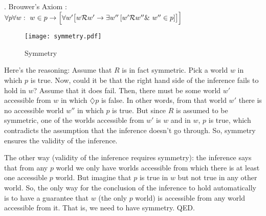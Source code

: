\ex. Brouwer's Axiom%
%
:\\
$\forall p \forall w:\ w\in p \rightarrow \Bigl[\forall w' \bigl[ w\mathcal{R}w'
\rightarrow \exists w'' \left[ w'\mathcal{R}w'' \&\ w''\in p\right]\bigr]\Bigr]$
%

\begin{figure}[htbp]
  \centering
    \texttt{[image: symmetry.pdf]}
  \caption{Symmetry}
  \label{fig:symmetry}
\end{figure}

\noindent
Here's %
%
the reasoning: Assume that $R$ is in fact symmetric. Pick a world $w$ in which
$p$ is true. Now, could it be that the right hand side of the inference fails to
hold in $w$? Assume that it does fail. Then, there must be some world $w'$
accessible from $w$ in which $\diamondsuit p$ is false. In other words, from
that world $w'$ there is no accessible world $w''$ in which $p$ is true. But
since $R$ is assumed to be symmetric, one of the worlds accessible from $w'$ is
$w$ and in $w$, $p$ is true, which contradicts the assumption that the inference
doesn't go through. So, symmetry ensures the validity of the inference.

The other way (validity of the inference requires symmetry): the inference says
that from any $p$ world we only have worlds accessible from which there is at
least one accessible $p$ world. But imagine that $p$ is true in $w$ but not true
in any other world. So, the only way for the conclusion of the inference to hold
automatically is to have a guarantee that $w$ (the only $p$ world) is accessible
from any world accessible from it. That is, we need to have symmetry. QED.

